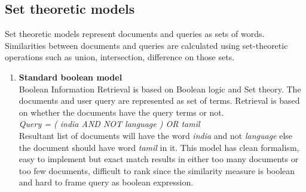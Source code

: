 
\subsection{Set theoretic models}
Set theoretic models represent documents and queries as sets of words. Similarities between documents and queries are calculated using set-theoretic operations such as union, intersection, difference on those sets.

\begin{enumerate}
\item{\textbf{Standard boolean model}}\\
Boolean Information Retrieval is based on Boolean logic and Set theory. The documents and user query are represented as set of terms. Retrieval is based on whether the documents have the query terms or not.\\
\textit{Query = ( \textit{india} AND NOT \textit{language} ) OR \textit{tamil}}\\
Resultant list of documents will have the word \textit{india} and not \textit{language} else the document should have word \textit{tamil} in it. This model has clean formalism, easy to implement but exact match results in either too many documents or too few documents, difficult to rank since the similarity measure is boolean and hard to frame query as boolean expression. 


\end{enumerate}
